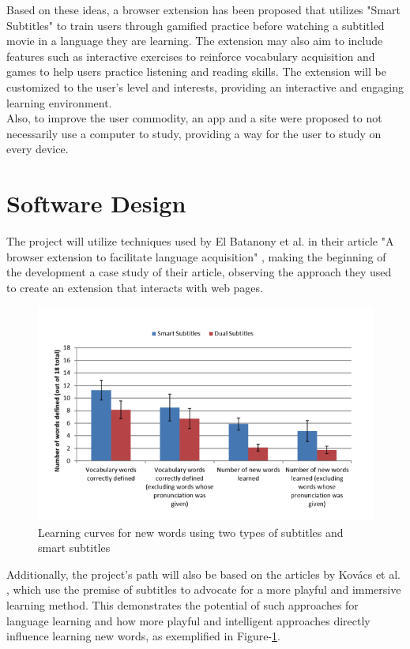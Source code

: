 \documentclass[12pt]{article}
\begin{document}
Based on these ideas, a browser extension has been proposed that utilizes "Smart Subtitles" to train users through gamified practice before watching a subtitled movie in a language they are learning. The extension may also aim to include features such as interactive exercises to reinforce vocabulary acquisition and games to help users practice listening and reading skills. The extension will be customized to the user's level and interests, providing an interactive and engaging learning environment. \\

Also, to improve the user commodity, an app and a site were proposed to not necessarily use a computer to study, providing a way for the user to study on every device. \\


\section{Software Design}
The project will utilize techniques used by El Batanony et al. in their article "A browser extension to facilitate language acquisition" \cite{ElBatanony21}, making the beginning of the development a case study of their article, observing the approach they used to create an extension that interacts with web pages. \\
\begin{figure}[h]
\centering
\caption{Learning curves for new words using two types of subtitles and smart subtitles}
\label{fig:my_label}
\includegraphics[width=1\textwidth]{assets/3.png}
\end{figure}
Additionally, the project's path will also be based on the articles by Kovács et al. \cite{Kovacs14}, which use the premise of subtitles to advocate for a more playful and immersive learning method. This demonstrates the potential of such approaches for language learning and how more playful and intelligent approaches directly influence learning new words, as exemplified in Figure-\ref{fig:my_label}. \\
\end{document}

